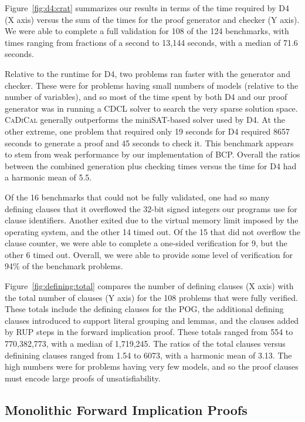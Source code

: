 \documentclass[letterpaper,USenglish,cleveref, autoref, thm-restate]{lipics-v2021}
\newcommand{\progname}[1]{\textsc{#1}}
\newcommand{\dfour}{\progname{D4}}
\newcommand{\cadical}{\progname{CaDiCal}}
\begin{document}
Figure~\ref{fig:d4:crat} summarizes our results in terms of the time
required by \dfour{} (X axis) versus the sum of the times for the
proof generator and checker (Y axis).
We were able to complete a full validation for 108 of the 124
benchmarks, with times ranging from fractions of a second to 13,144
seconds, with a median of 71.6 seconds.

Relative to the runtime for \dfour{}, two problems ran faster with the
generator and checker.  These were for problems having small numbers
of models (relative to the number of variables), and so most of the
time spent by both \dfour{} and our proof generator was in running a
CDCL solver to search the very sparse solution space.  \cadical{}
generally outperforms the miniSAT-based solver used by \dfour{}.  At
the other extreme, one problem that required only 19 seconds for
\dfour{} required 8657 seconds to generate a proof and 45 seconds to
check it.  This benchmark appears to stem from weak performance
by our implementation of BCP\@.  Overall the ratios
between the combined generation plus checking times versus the time
for \dfour{} had a harmonic mean of 5.5.

Of the 16 benchmarks that could not be fully validated, one had so
many defining clauses that it overflowed the 32-bit signed integers
our programs use for clause identifiers.  Another exited due to the
virtual memory limit imposed by the operating system, and the other 14
timed out.  Of the 15 that did not overflow the clause counter, we
were able to complete a one-sided verification for 9, but the other 6
timed out.  Overall, we were able to provide some level of
verification for 94\% of the benchmark problems.



Figure~\ref{fig:defining:total} compares the number of defining
clauses (X axis) with the total number of clauses (Y axis) for the 108
problems that were fully verified.  These totals include the defining
clauses for the POG, the additional defining clauses introduced to
support literal grouping and lemmas, and the clauses added by RUP
steps in the forward implication proof.  These totals ranged from 554
to 770,382,773, with a median of 1,719,245.  The ratios of the total
clauses versus definining clauses ranged from 1.54 to 6073, with a
harmonic mean of 3.13.  The high numbers were for problems having very
few models, and so the proof clauses must encode large proofs of
unsatisfiability.

\subsection{Monolithic Forward Implication Proofs}
\label{app:experiment:monolithic}
\end{document}
